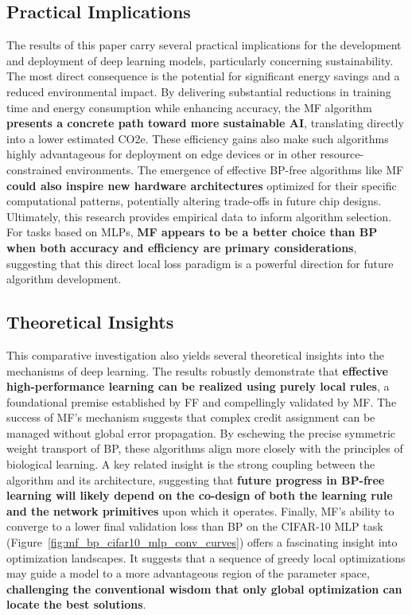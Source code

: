 \subsection{Practical Implications}
\label{sec:discussion_implications}

The results of this paper carry several practical implications for the development and deployment of deep learning models, particularly concerning sustainability. The most direct consequence is the potential for significant energy savings and a reduced environmental impact. By delivering substantial reductions in training time and energy consumption while enhancing accuracy, the MF algorithm \textbf{presents a concrete path toward more sustainable AI}, translating directly into a lower estimated CO2e. These efficiency gains also make such algorithms highly advantageous for deployment on edge devices or in other resource-constrained environments. The emergence of effective BP-free algorithms like MF \textbf{could also inspire new hardware architectures} optimized for their specific computational patterns, potentially altering trade-offs in future chip designs. Ultimately, this research provides empirical data to inform algorithm selection. For tasks based on MLPs, \textbf{MF appears to be a better choice than BP when both accuracy and efficiency are primary considerations}, suggesting that this direct local loss paradigm is a powerful direction for future algorithm development.

\pagebreak

\subsection{Theoretical Insights}
\label{sec:discussion_theoretical}

This comparative investigation also yields several theoretical insights into the mechanisms of deep learning. The results robustly demonstrate that \textbf{effective high-performance learning can be realized using purely local rules}, a foundational premise established by FF and compellingly validated by MF. The success of MF's mechanism suggests that complex credit assignment can be managed without global error propagation. By eschewing the precise symmetric weight transport of BP, these algorithms align more closely with the principles of biological learning. A key related insight is the strong coupling between the algorithm and its architecture, suggesting that \textbf{future progress in BP-free learning will likely depend on the co-design of both the learning rule and the network primitives} upon which it operates. Finally, MF's ability to converge to a lower final validation loss than BP on the CIFAR-10 MLP task (Figure~\ref{fig:mf_bp_cifar10_mlp_conv_curves}) offers a fascinating insight into optimization landscapes. It suggests that a sequence of greedy local optimizations may guide a model to a more advantageous region of the parameter space, \textbf{challenging the conventional wisdom that only global optimization can locate the best solutions}.

